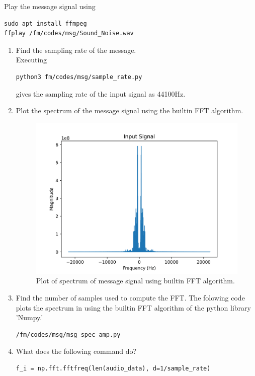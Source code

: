 Play the message signal using
\begin{lstlisting}
sudo apt install ffmpeg
ffplay /fm/codes/msg/Sound_Noise.wav
\end{lstlisting}
\begin{enumerate}[label=\arabic*.,ref=\thesection.\theenumi]
\item Find the sampling rate of the message.
\\
	\solution
Executing	
\begin{lstlisting}
python3 fm/codes/msg/sample_rate.py
\end{lstlisting}
gives
the sampling rate of the input signal as 44100Hz.
\item Plot the spectrum of the message signal using the builtin FFT algorithm.\\
	\solution		
\begin{figure}[H]
\centering
\includegraphics[width=\columnwidth]{fm/msg/figs/FFTbuiltin/inputs-1.png}
\caption{Plot of spectrum of message signal using builtin FFT algorithm.}
\label{fig:FFTb}
\end{figure}
\item Find the number of samples used to compute the FFT.
The folowing code plots the spectrum in  using the builtin FFT algorithm of the python library 'Numpy.'
\begin{lstlisting}
/fm/codes/msg/msg_spec_amp.py
\end{lstlisting}
\item What does the following command do?
\begin{lstlisting}
f_i = np.fft.fftfreq(len(audio_data), d=1/sample_rate)
\end{lstlisting}


\end{enumerate}
